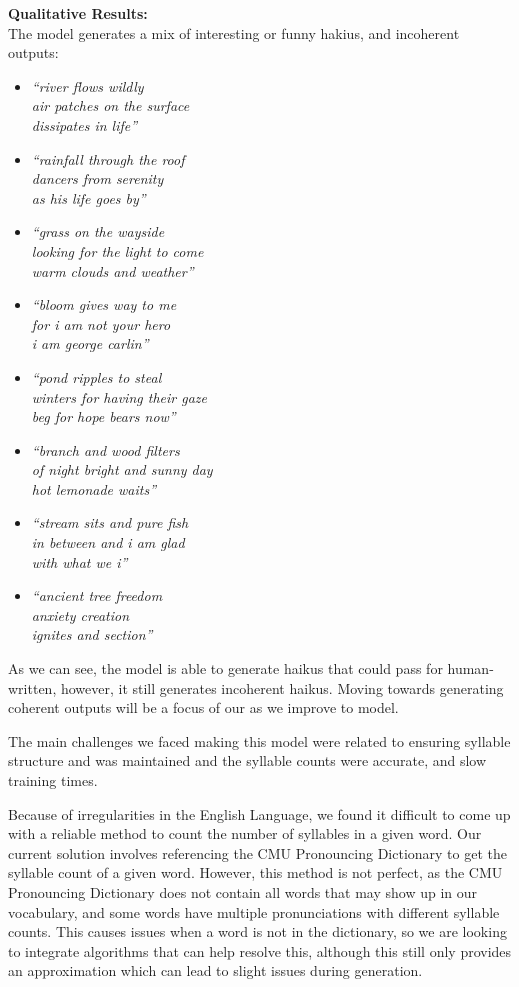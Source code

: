 \documentclass{article} %
\begin{document}
\textbf{Qualitative Results:} \\
The model generates a mix of interesting or funny hakius, and incoherent outputs:
\begin{itemize}
  \item \textit{“river flows wildly \\
  air patches on the surface \\
  dissipates in life”}
  \item \textit{“rainfall through the roof \\
  dancers from serenity \\
  as his life goes by”}
  \item \textit{“grass on the wayside \\
  looking for the light to come \\
  warm clouds and weather”}
  \item \textit{“bloom gives way to me \\
  for i am not your hero \\ 
  i am george carlin”}
  \item \textit{“pond ripples to steal \\
  winters for having their gaze \\
  beg for hope bears now”}
  \item \textit{“branch and wood filters \\
  of night bright and sunny day \\
  hot lemonade waits”}
  \item \textit{“stream sits and pure fish \\
  in between and i am glad \\
  with what we i”}
  \item \textit{“ancient tree freedom \\
  anxiety creation \\
  ignites and section”}
\end{itemize}

As we can see, the model is able to generate haikus that could pass for human-written, however, it still generates
incoherent haikus. Moving towards generating coherent outputs will be a focus of our as we improve to model.

The main challenges we faced making this model were 
related to ensuring syllable structure and was maintained and the syllable counts were accurate, and 
slow training times.

Because of irregularities in the English Language, we found it difficult to
come up with a reliable method to count the number of syllables in a given word. Our current solution involves referencing 
the CMU Pronouncing Dictionary \citep{cmu_pronouncing_dictionary} to get the syllable count of a given word. 
However, this method is not perfect, as the CMU Pronouncing Dictionary does not contain all words that may show up in our vocabulary, 
and some words have multiple pronunciations with different syllable counts.
This causes issues when a word is not in the dictionary, so we are looking to integrate algorithms that can help resolve this, although this still only provides an approximation which can lead to slight issues during generation.
\end{document}
